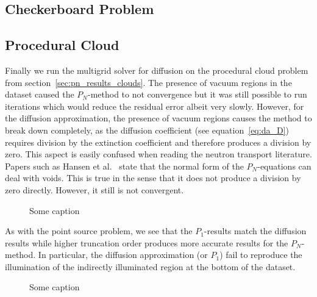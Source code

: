 \subsection{Checkerboard Problem}
\label{sec:da_results_checkerboard}

\subsection{Procedural Cloud}
\label{sec:da_results_clouds}

Finally we run the multigrid solver for diffusion on the procedural cloud problem from section~\ref{sec:pn_results_clouds}. The presence of vacuum regions in the dataset caused the $P_N$-method to not convergence but it was still possible to run iterations which would reduce the residual error albeit very slowly. However, for the diffusion approximation, the presence of vacuum regions causes the method to break down completely, as the diffusion coefficient (see equation~\ref{eq:da_D}) requires division by the extinction coefficient and therefore produces a division by zero. This aspect is easily confused when reading the neutron transport literature. Papers such as Hansen et al.~\cite{Hansen14} state that the normal form of the $P_N$-equations can deal with voids. This is true in the sense that it does not produce a division by zero directly. However, it still is not convergent.

\begin{figure}[h]
\centering
{}
\caption{Some caption}
\label{fig:da_results_nebulae_1}
\end{figure}

As with the point source problem, we see that the $P_1$-results match the diffusion results while higher truncation order produces more accurate results for the $P_N$-method. In particular, the diffusion approximation (or $P_1$) fail to reproduce the illumination of the indirectly illuminated region at the bottom of the dataset.
\begin{figure}[h]
\centering
{}
\caption{Some caption}
\label{fig:da_results_nebulae_2}
\end{figure}
